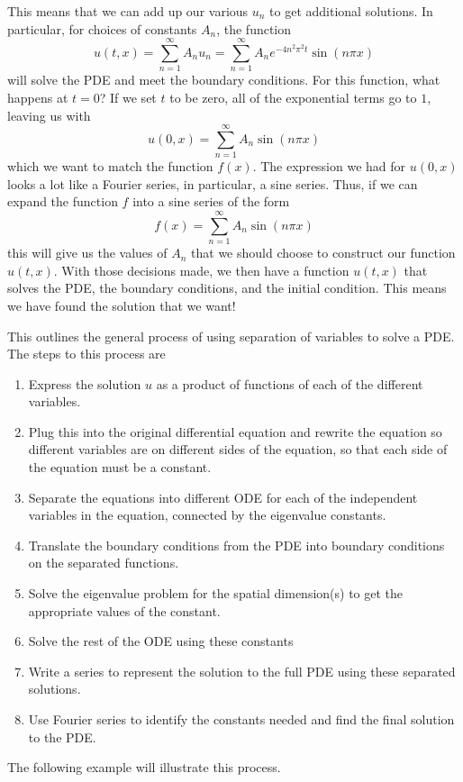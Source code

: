 \documentclass{ximera}
\begin{document}
This means that we can add up our various $u_n$ to get additional solutions. In particular, for choices of constants $A_n$, the function
\[ 
    u(t,x) = \sum_{n=1}^\infty A_n u_n = \sum_{n=1}^\infty A_n e^{-4n^2\pi^2 t}\sin(n\pi x) 
\] 
will solve the PDE and meet the boundary conditions. For this function, what happens at $t=0$? If we set $t$ to be zero, all of the exponential terms go to $1$, leaving us with
\[ 
    u(0, x) =  \sum_{n=1}^\infty A_n \sin(n\pi x) 
\] 
which we want to match the function $f(x)$. The expression we had for $u(0,x)$ looks a lot like a Fourier series, in particular, a sine series. Thus, if we can expand the function $f$ into a sine series of the form 
\[ 
    f(x) = \sum_{n=1}^\infty A_n \sin(n\pi x) 
\] 
this will give us the values of $A_n$ that we should choose to construct our function $u(t,x)$. With those decisions made, we then have a function $u(t,x)$ that solves the PDE, the boundary conditions, and the initial condition. This means we have found the solution that we want!

This outlines the general process of using separation of variables to solve a PDE. The steps to this process are
\begin{enumerate}
    \item Express the solution $u$ as a product of functions of each of the different variables.
    \item Plug this into the original differential equation and rewrite the equation so different variables are on different sides of the equation, so that each side of the equation must be a constant.
    \item Separate the equations into different ODE for each of the independent variables in the equation, connected by the eigenvalue constants.
    \item Translate the boundary conditions from the PDE into boundary conditions on the separated functions.
    \item Solve the eigenvalue problem for the spatial dimension(s) to get the appropriate values of the constant.
    \item Solve the rest of the ODE using these constants
    \item Write a series to represent the solution to the full PDE using these separated solutions.
    \item Use Fourier series to identify the constants needed and find the final solution to the PDE.
\end{enumerate}

The following example will illustrate this process.
\end{document}
